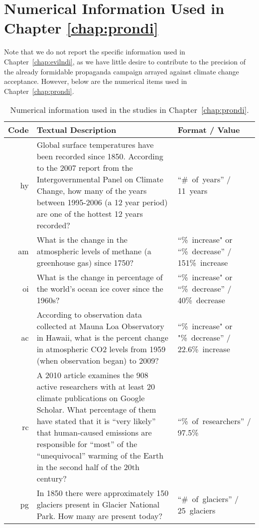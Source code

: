 \chapter{Numerical Information Used in Chapter \ref{chap:prondi}}
\label{app:numbers}

Note that we do not report the specific information used in
Chapter~\ref{chap:evilndi}, as we have little desire to contribute to the
precision of the already formidable propaganda campaign arrayed against climate
change acceptance.  However, below are the numerical items used in
Chapter~\ref{chap:prondi}.


\begin{table}
    \caption{Numerical information used in the studies in Chapter~\ref{chap:prondi}.}
    \begin{tabu}{>{\sffamily}rX[3]X[-1,l]}
        \toprule
        Code & Textual Description & Format / Value \\
        \midrule

hy &
Global surface temperatures have been recorded since 1850. According to the 2007
report from the Intergovernmental Panel on Climate Change, how many of the years
between 1995-2006 (a 12 year period) are one of the hottest 12 years recorded? &
“\#~of~years” /
11~years \\

am &
What is the change in the atmospheric levels of methane (a greenhouse gas) since
1750? &
“\%~increase" or “\%~decrease” /
151\%~increase \\

oi &
What is the change in percentage of the world's ocean ice cover since the 1960s?
&
“\%~increase" or “\%~decrease” /
40\%~decrease \\

ac &
According to observation data collected at Mauna Loa Observatory in Hawaii, what
is the percent change in atmospheric CO2 levels from 1959 (when observation
began) to 2009? &
“\%~increase" or "\%~decrease” /
22.6\%~increase \\

rc &
A 2010 article examines the 908 active researchers with at least 20 climate
publications on Google Scholar. What percentage of them have stated that it is
“very likely” that human-caused emissions are responsible for “most” of the
“unequivocal” warming of the Earth in the second half of the 20th century? &
“\%~of~researchers” /
97.5\% \\

pg &
In 1850 there were approximately 150 glaciers present in Glacier National Park.
How many are present today? &
“\#~of~glaciers” /
25~glaciers \\


\end{tabu}
\end{table}
